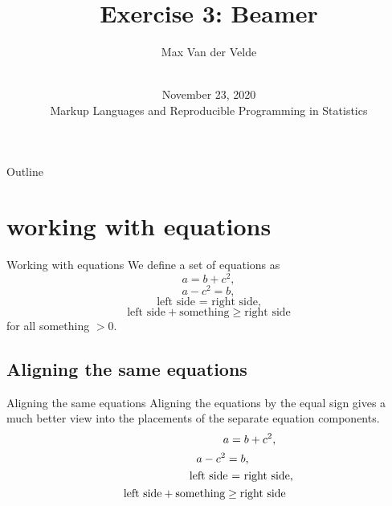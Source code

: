 \documentclass{beamer}
\title{Exercise 3: Beamer}
\author{Max Van der Velde }
\date{\vspace{1 in}\\November 23, 2020\\ Markup Languages and Reproducible Programming in Statistics }
\begin{document}
\maketitle
\begin{frame}{Outline}
\tableofcontents
\end{frame}

\section{working with equations}
\begin{frame}{Working with equations}
We define a set of equations as
\begin{equation}
    a=b+c^2,
\end{equation}
\begin{equation}
    a-c^2=b,
\end{equation}
\begin{equation}
    \text{left side = right side,}
\end{equation}
\begin{equation}
    \text{left side} +\text{something} \geq \text{right side} 
\end{equation}
for all something $> 0$.
\end{frame}

\subsection{Aligning the same equations}
\begin{frame}{Aligning the same equations}
Aligning the equations by the equal sign gives a much better view into the placements of the separate equation components.
\begin{equation}\hspace{1 in}
    a=b+c^2,
\end{equation}
\begin{equation}\hspace{0.35 in}
    a-c^2=b,
\end{equation}
\begin{equation}\hspace{0.8 in}
    \text{left side = right side,}
\end{equation}
\begin{equation}\hspace{-0.1 in}
    \text{left side} +\text{something} \geq \text{right side} 
\end{equation}
\end{frame}
\end{document}

